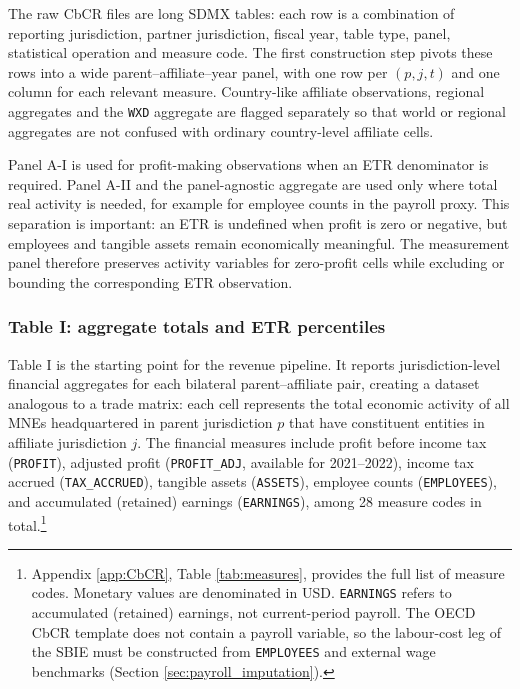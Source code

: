 \documentclass[11pt,a4paper]{article}
\newcommand{\code}[1]{\texttt{#1}}
\begin{document}
The raw CbCR files are long SDMX tables: each row is a combination of reporting jurisdiction, partner jurisdiction, fiscal year, table type, panel, statistical operation and measure code. The first construction step pivots these rows into a wide parent--affiliate--year panel, with one row per $(p,j,t)$ and one column for each relevant measure. Country-like affiliate observations, regional aggregates and the \code{WXD} aggregate are flagged separately so that world or regional aggregates are not confused with ordinary country-level affiliate cells.

Panel A-I is used for profit-making observations when an ETR denominator is required. Panel A-II and the panel-agnostic aggregate are used only where total real activity is needed, for example for employee counts in the payroll proxy. This separation is important: an ETR is undefined when profit is zero or negative, but employees and tangible assets remain economically meaningful. The measurement panel therefore preserves activity variables for zero-profit cells while excluding or bounding the corresponding ETR observation. 

\subsubsection{Table I: aggregate totals and ETR percentiles}\label{sec:t1_main}

Table I is the starting point for the revenue pipeline. It reports jurisdiction-level financial aggregates for each bilateral parent--affiliate pair, creating a dataset analogous to a trade matrix: each cell represents the total economic activity of all MNEs headquartered in parent jurisdiction $p$ that have constituent entities in affiliate jurisdiction $j$. The financial measures include profit before income tax (\code{PROFIT}), adjusted profit (\code{PROFIT\_ADJ}, available for 2021--2022), income tax accrued (\code{TAX\_ACCRUED}), tangible assets (\code{ASSETS}), employee counts (\code{EMPLOYEES}), and accumulated (retained) earnings (\code{EARNINGS}), among 28 measure codes in total.\footnote{Appendix \ref{app:CbCR}, Table \ref{tab:measures}, provides the full list of measure codes. Monetary values are denominated in USD. \code{EARNINGS} refers to accumulated (retained) earnings, not current-period payroll. The OECD CbCR template does not contain a payroll variable, so the labour-cost leg of the SBIE must be constructed from \code{EMPLOYEES} and external wage benchmarks (Section \ref{sec:payroll_imputation}).}
\end{document}
